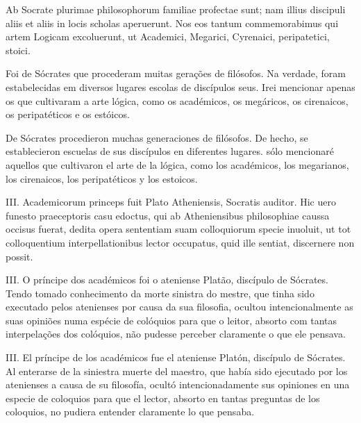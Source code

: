 \documentclass{article}
\begin{document}
\begin{paracol}{3}
\begin{nthcolumn*}{0}
    Ab Socrate plurimae philosophorum familiae profectae sunt; nam illius discipuli aliis et aliis in locis scholas aperuerunt. Nos eos tantum commemorabimus qui artem Logicam excoluerunt, ut Academici, Megarici, Cyrenaici, peripatetici, stoici.
  \end{nthcolumn*}
  \vspace{0.5cm}
  \begin{nthcolumn}{1} %
    Foi de Sócrates que procederam muitas gerações de filósofos. Na verdade, foram estabelecidas em diversos lugares escolas de discípulos seus. Irei mencionar apenas os que cultivaram a arte lógica, como os académicos, os megáricos, os cirenaicos, os peripatéticos e os estóicos.
  \end{nthcolumn}
  \vspace{0.5cm}
  \begin{nthcolumn}{2} %
    De Sócrates procedieron muchas generaciones de filósofos. De hecho, se establecieron escuelas de sus discípulos en diferentes lugares. sólo mencionaré aquellos que cultivaron el arte de la lógica, como los académicos, los megarianos, los cirenaicos, los peripatéticos y los estoicos.
  \end{nthcolumn}
  \vspace{0.5cm}
  \begin{nthcolumn*}{0} %
    III. Academicorum princeps fuit Plato Atheniensis, Socratis auditor. Hic uero funesto praeceptoris casu edoctus, qui ab Atheniensibus philosophiae caussa occisus fuerat, dedita opera sententiam suam colloquiorum specie inuoluit, ut tot colloquentium interpellationibus lector occupatus, quid ille sentiat, discernere non possit.
  \end{nthcolumn*}
  \vspace{0.5cm}
  \begin{nthcolumn}{1} %
    III. O príncipe dos académicos foi o ateniense Platão, discípulo de Sócrates. Tendo tomado conhecimento da morte sinistra do mestre, que tinha sido executado pelos atenienses por causa da sua filosofia, ocultou intencionalmente as suas opiniões numa espécie de colóquios para que o leitor, absorto com tantas interpelações dos colóquios, não pudesse perceber claramente o que ele pensava.
  \end{nthcolumn}
  \vspace{0.5cm}
  \begin{nthcolumn}{2} %
    III. El príncipe de los académicos fue el ateniense Platón, discípulo de Sócrates. Al enterarse de la siniestra muerte del maestro, que había sido ejecutado por los atenienses a causa de su filosofía, ocultó intencionadamente sus opiniones en una especie de coloquios para que el lector, absorto en tantas preguntas de los coloquios, no pudiera entender claramente lo que pensaba.

\end{nthcolumn}
\end{paracol}
\end{document}
